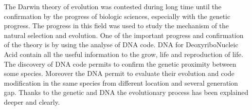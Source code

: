 The Darwin theory of evolution was contested during long time until the confirmation by the progress of biologic sciences, especially with the genetic progress. The progress in this field was used to study the mechanism of the natural selection and evolution. One of the important progress and confirmation of the theory is by using the analyse of DNA code. DNA for DeoxyriboNucleic Acid contain all the useful information  to the  grow, life and reproduction of life.   \\
The discovery of DNA code permits to confirm the genetic proximity between  some species. Moreover the DNA permit to evaluate their evolution and code modification in the same species from different location and several generation gap. %
Thanks to  the genetic  and DNA the evolutionary process has been explained deeper and clearly. 



